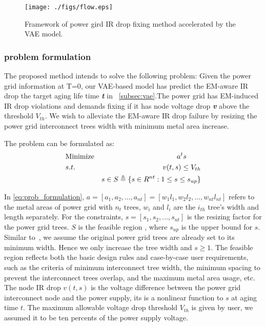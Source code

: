 \begin{figure}[h!]
	\centering
	\texttt{[image: ./figs/flow.eps]}
	\caption{Framework of power gird IR drop fixing method accelerated by the VAE model.}
	\label{fig:flow}
\end{figure}

\subsubsection{problem formulation}
\label{subsubsec:formulation}
The proposed method intends to solve the following problem: 
Given the power grid information at T=0, our VAE-based model has predict the EM-aware IR drop the target aging life time \textit{\textbf{t}} in ~\ref{subsec:vae}.The power grid has EM-induced IR drop violations and demands fixing if it has node voltage drop \textit{\textbf{v}}  above the threshold $V_{th}$.
We wish to alleviate the EM-aware IR drop failure by resizing the power grid interconnect trees width with minimum metal area increase.

The problem can be formulated as:
\begin{align}
	\label{eq:prob_formulation}
	&\mbox{Minimize}  & a^{t}s \qquad   \notag  \\
	&s.t.     & v(t,s)\leq V_{th} \\
	& \quad   &s \in S   \triangleq \{ s \in R^{nt}: 1 \leq s \leq s_{up} \}        \notag
\end{align}

In \eqref{eq:prob_formulation}, $a=[a_{1},a_{2},\ldots,a_{nt}] = [w_{1}l_{1},w_{2}l_{2},\ldots,w_{nt}l_{nt}]$ refers to the metal areas of power grid with $n_{t}$ trees, $w_{i}$ and $l_{i}$ are the $i_{th}$ tree's width and length separately.
For the constraints, $s=[s_{1},s_{2},\ldots,s_{nt}]$  is the resizing factor for the power grid trees. $S$ is the feasible region ,
where $s_{up}$ is the upper bound for $s$. Similar to~\cite{Sukharev:2019pg}, we assume the original power grid trees are already set to its minimum width. Hence we only increase the tree width and $s \geq 1 $.
The feasible region reflects both the basic design rules and case-by-case user requirements, such as the criteria of minimum interconnect tree width, the minimum spacing to prevent the  interconnect trees overlap, and the maximum metal area usage, etc. 
The node IR drop $v(t,s)$  is the voltage difference between the power grid interconnect node and the power supply, its is a nonlinear function to $s$ at aging time $t$. The maximum allowable voltage drop threshold $V_{th}$ is given by user, we assumed it to be ten percents of the power supply voltage.


